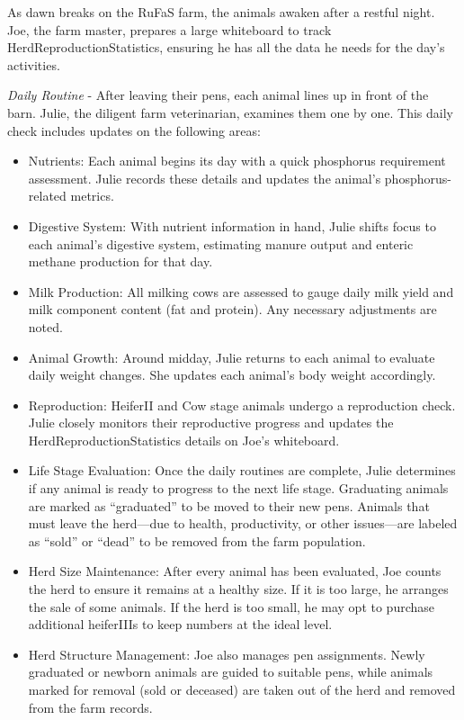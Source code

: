 \documentclass[
  letterpaper,
  oneside,
  openany]{scrbook}
\begin{document}
As dawn breaks on the RuFaS farm, the animals awaken after a restful
night. Joe, the farm master, prepares a large whiteboard to track
HerdReproductionStatistics, ensuring he has all the data he needs for
the day's activities.

\emph{Daily Routine} - After leaving their pens, each animal lines up in
front of the barn. Julie, the diligent farm veterinarian, examines them
one by one. This daily check includes updates on the following areas:

\begin{itemize}
\item
  Nutrients: Each animal begins its day with a quick phosphorus
  requirement assessment. Julie records these details and updates the
  animal's phosphorus-related metrics.
\item
  Digestive System: With nutrient information in hand, Julie shifts
  focus to each animal's digestive system, estimating manure output and
  enteric methane production for that day.
\item
  Milk Production: All milking cows are assessed to gauge daily milk
  yield and milk component content (fat and protein). Any necessary
  adjustments are noted.
\item
  Animal Growth: Around midday, Julie returns to each animal to evaluate
  daily weight changes. She updates each animal's body weight
  accordingly.
\item
  Reproduction: HeiferII and Cow stage animals undergo a reproduction
  check. Julie closely monitors their reproductive progress and updates
  the HerdReproductionStatistics details on Joe's whiteboard.
\item
  Life Stage Evaluation: Once the daily routines are complete, Julie
  determines if any animal is ready to progress to the next life stage.
  Graduating animals are marked as ``graduated'' to be moved to their
  new pens. Animals that must leave the herd---due to health,
  productivity, or other issues---are labeled as ``sold'' or ``dead'' to
  be removed from the farm population.
\item
  Herd Size Maintenance: After every animal has been evaluated, Joe
  counts the herd to ensure it remains at a healthy size. If it is too
  large, he arranges the sale of some animals. If the herd is too small,
  he may opt to purchase additional heiferIIIs to keep numbers at the
  ideal level.
\item
  Herd Structure Management: Joe also manages pen assignments. Newly
  graduated or newborn animals are guided to suitable pens, while
  animals marked for removal (sold or deceased) are taken out of the
  herd and removed from the farm records.
\end{itemize}
\end{document}
